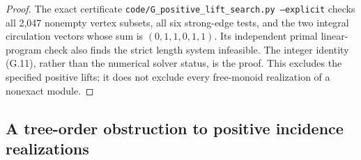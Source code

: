 \begin{proof}
The exact certificate
\texttt{code/G\_positive\_lift\_search.py --explicit} checks
all 2,047 nonempty vertex subsets, all six strong-edge tests,
and the two integral circulation vectors whose sum is
$(0,1,1,0,1,1)$.  Its independent primal linear-program check
also finds the strict length system infeasible.  The integer
identity (G.11), rather than the numerical solver status, is
the proof.  This excludes the specified positive lifts; it does
not exclude every free-monoid realization of a nonexact module.
\end{proof}

\subsection{A tree-order obstruction to positive incidence realizations}

